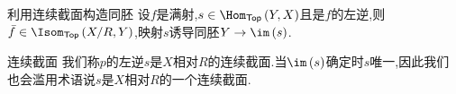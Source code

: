 \begin{proposition}{利用连续截面构造同胚}{}
	设$f$是满射,$s\in\Hom_{\mathsf{Top}}\left(Y,X\right)$且是$f$的左逆,则$\bar{f}\in\Isom_{\mathsf{Top}}\left(X/R,Y\right)$,映射$s$诱导同胚$Y\to\im\left(s\right)$.
\end{proposition}

\begin{definition}{连续截面}{}
	我们称$p$的左逆$s$是$X$相对$R$的连续截面.当$\im\left(s\right)$确定时$s$唯一,因此我们也会滥用术语说$s$是$X$相对$R$的一个连续截面.
\end{definition}



















